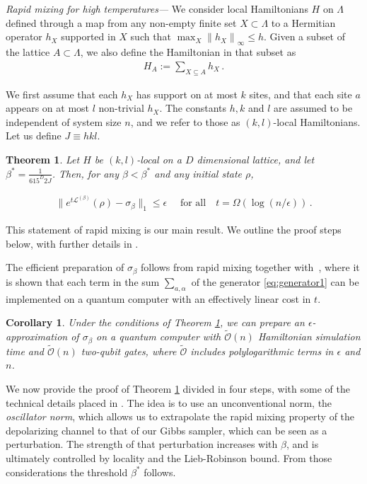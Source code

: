 \documentclass[aps,pra,amsmath,amssymb,twocolumn,10pt]{revtex4-2}
\newtheorem{thm}{Theorem}
\newtheorem{coro}{Corollary}
\theoremstyle{definition}
\newcommand{\norm}[1]{\left\|#1\right\|}
\begin{document}
\emph{Rapid mixing for high temperatures—} We consider local Hamiltonians $H$ on $\Lambda$ defined through a map from any non-empty finite set $X\subset \Lambda$ to a Hermitian operator $h_X$ supported in $X$ such that $\max_{X} \norm{h_X}_\infty \le h$. Given a subset of the lattice  $A \subset \Lambda$, we also define the Hamiltonian in that subset as
\begin{align*}
		H_A:=\sum_{X\subseteq A}h_X\,.
\end{align*}

We first assume that each $h_X$ has support on at most $k$ sites, and that each site $a$ appears on at most $l$ non-trivial $h_X$. The constants $h,k$ and $l$ are assumed to be independent of system size $n$, and we refer to those as $(k,l)$-local Hamiltonians. Let us define $J\equiv hkl$.

\begin{thm}\label{thmrmhighT1}
Let $H$ be $(k,l)$-local on a $D$ dimensional lattice, and let $\beta^*=\frac{1}{615^{D}2J}$. Then, for any $\beta<\beta^*$ and any initial state $\rho$,

\begin{align}\label{equ:mixing_gap}
\|e^{t\mathcal{L}^{(\beta)}}(\rho)-\sigma_\beta\|_1\le \epsilon\quad \text{ for all}\quad t=\Omega(\log(n/\epsilon))\,. 
\end{align}

\end{thm}


This statement of rapid mixing is our main result. We outline the proof steps below, with further details in \cite{supplemental}. 

The efficient preparation of $\sigma_\beta$ follows from rapid mixing together with~\cite[Theorem I.2]{chen2023efficient}, where it is shown that each term in the sum $\sum_{a,\alpha}$ of the generator \eqref{eq:generator1} can be implemented on a quantum computer with an effectively linear cost in $t$.
\begin{coro}
   Under the conditions of Theorem \ref{thmrmhighT1}, we can prepare an $\epsilon$-approximation of $\sigma_\beta$ on a quantum computer with $\widetilde{\mathcal{O}}(n)$ Hamiltonian simulation time and $\widetilde{\mathcal{O}}(n)$ two-qubit gates, where $\widetilde{\mathcal{O}}$ includes polylogarithmic terms in $\epsilon$ and $n$.
\end{coro}
We now provide the proof of Theorem \ref{thmrmhighT1} divided in four steps, with some of the technical details placed in \cite{supplemental}. The idea is to use an unconventional norm, the \emph{oscillator norm}, which allows us to extrapolate the rapid mixing property of the depolarizing channel to that of our Gibbs sampler, which can be seen as a perturbation. The strength of that perturbation increases with $\beta$, and is ultimately controlled by locality and the Lieb-Robinson bound. From those considerations the threshold $\beta^*$ follows.
\medskip
\end{document}
